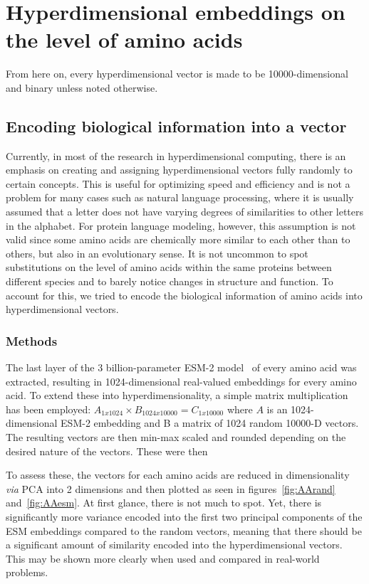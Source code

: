 \chapter{Hyperdimensional embeddings on the level of amino acids}
From here on, every hyperdimensional vector is made to be 10000-dimensional and binary unless noted otherwise.
\section{Encoding biological information into a vector}
Currently, in most of the research in hyperdimensional computing, there is an emphasis on creating and assigning hyperdimensional vectors fully randomly to certain concepts. This is useful for optimizing speed and efficiency and is not a problem for many cases such as natural language processing, where it is usually assumed that a letter does not have varying degrees of similarities to other letters in the alphabet. For protein language modeling, however, this assumption is not valid since some amino acids are chemically more similar to each other than to others, but also in an evolutionary sense. It is not uncommon to spot substitutions on the level of amino acids within the same proteins between different species and to barely notice changes in structure and function. To account for this, we tried to encode the biological information of amino acids into hyperdimensional vectors.

\subsection*{Methods}
The last layer of the 3 billion-parameter ESM-2 model~\cite{esm2} of every amino acid was extracted, resulting in 1024-dimensional real-valued embeddings for every amino acid. To extend these into hyperdimensionality, a simple matrix multiplication has been employed: $A_{1x1024} \times B_{1024x10000} = C_{1x10000}$ where $A$ is an 1024-dimensional ESM-2 embedding and B a matrix of 1024 random 10000-D vectors. The resulting vectors are then min-max scaled and rounded depending on the desired nature of the vectors. These were then 

To assess these, the vectors for each amino acids are reduced in dimensionality \textit{via} PCA into 2 dimensions and then plotted as seen in figures~\ref{fig:AArand} and~\ref{fig:AAesm}. At first glance, there is not much to spot. Yet, there is significantly more variance encoded into the first two principal components of the ESM embeddings compared to the random vectors, meaning that there should be a significant amount of similarity encoded into the hyperdimensional vectors. This may be shown more clearly when used and compared in real-world problems.


